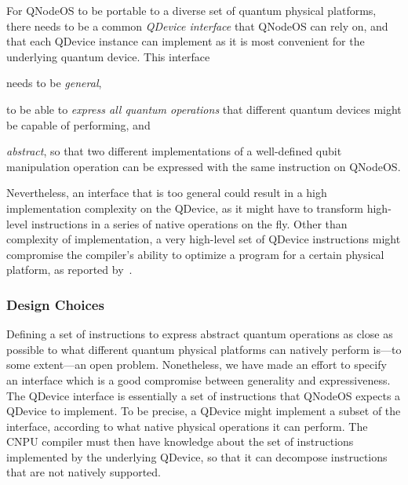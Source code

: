For \ac{QNodeOS} to be portable to a diverse set of quantum physical platforms, there needs to be a common \emph{\ac{QDevice} interface} that \ac{QNodeOS} can rely on, and that each \ac{QDevice} instance can implement as it is most convenient for the underlying quantum device. This interface \begin{inlinelist} \item needs to be \emph{general}, \item to be able to \emph{express all quantum operations} that different quantum devices might be capable of performing, and \item \emph{abstract}, so that two different implementations of a well-defined qubit manipulation operation can be expressed with the same instruction on \ac{QNodeOS}.\end{inlinelist} Nevertheless, an interface that is too general could result in a high implementation complexity on the \ac{QDevice}, as it might have to transform high-level instructions in a series of native operations on the fly. Other than complexity of implementation, a very high-level set of \ac{QDevice} instructions might compromise the compiler's ability to optimize a program for a certain physical platform, as reported by~\textcite{murali_2019_fullstack}.

\subsubsection{Design Choices}

Defining a set of instructions to express abstract quantum operations as close as possible to what different quantum physical platforms can natively perform is---to some extent---an open problem. Nonetheless, we have made an effort to specify an interface which is a good compromise between generality and expressiveness. The \ac{QDevice} interface is essentially a set of instructions that \ac{QNodeOS} expects a \ac{QDevice} to implement. To be precise, a \ac{QDevice} might implement a subset of the interface, according to what native physical operations it can perform. The CNPU compiler must then have knowledge about the set of instructions implemented by the underlying \ac{QDevice}, so that it can decompose instructions that are not natively supported.

